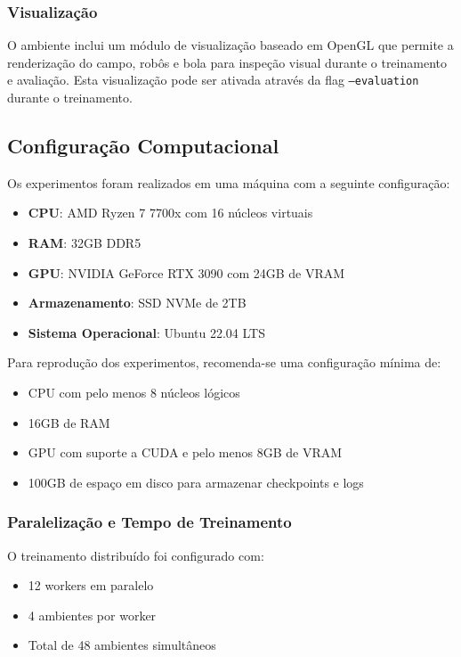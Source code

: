 \subsubsection{Visualização}

O ambiente inclui um módulo de visualização baseado em OpenGL que permite a renderização do campo, robôs e bola para inspeção visual durante o treinamento e avaliação. Esta visualização pode ser ativada através da flag \texttt{--evaluation} durante o treinamento.

\subsection{Configuração Computacional}

Os experimentos foram realizados em uma máquina com a seguinte configuração:

\begin{itemize}
    \item \textbf{CPU}: AMD Ryzen 7 7700x com 16 núcleos virtuais
    \item \textbf{RAM}: 32GB DDR5
    \item \textbf{GPU}: NVIDIA GeForce RTX 3090 com 24GB de VRAM
    \item \textbf{Armazenamento}: SSD NVMe de 2TB
    \item \textbf{Sistema Operacional}: Ubuntu 22.04 LTS
\end{itemize}

Para reprodução dos experimentos, recomenda-se uma configuração mínima de:

\begin{itemize}
    \item CPU com pelo menos 8 núcleos lógicos
    \item 16GB de RAM
    \item GPU com suporte a CUDA e pelo menos 8GB de VRAM
    \item 100GB de espaço em disco para armazenar checkpoints e logs
\end{itemize}

\subsubsection{Paralelização e Tempo de Treinamento}

O treinamento distribuído foi configurado com:

\begin{itemize}
    \item 12 workers em paralelo
    \item 4 ambientes por worker
    \item Total de 48 ambientes simultâneos
\end{itemize}

